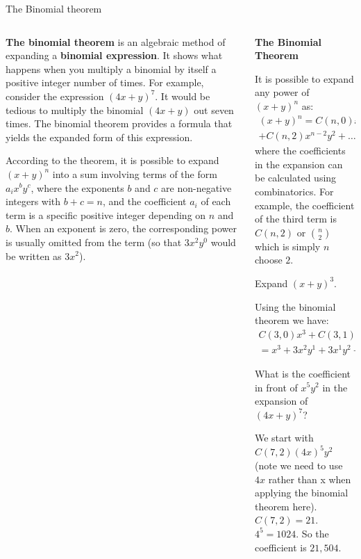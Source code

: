 \documentclass[9pt,aspectratio=169]{beamer}
\begin{document}
\begin{frame}{The Binomial theorem}
  \begin{columns}[T]
    \begin{column}{0.43\textwidth}
      \textbf{The binomial theorem} is an algebraic method of expanding a \textbf{binomial expression}.  It shows what happens when you multiply a binomial by itself a positive integer number of times.  For example, consider the expression $(4x+y)^7$. It would be tedious to multiply the binomial $(4x+y)$ out seven times. The binomial theorem provides a formula that yields the expanded form of this expression.
      
      \medskip
      According to the theorem, it is possible to expand $(x+y)^n$ into a sum involving terms of the form $a_i x^b y^c$, where the exponents $b$ and $c$ are non-negative integers with $b + c = n$, and the coefficient $a_i$ of each term is a specific positive integer depending on $n$ and $b$. When an exponent is zero, the corresponding power is usually omitted from the term (so that $3x^2 y^0$ would be written as $3x^2$).

    \end{column}
    \begin{column}{0.57\textwidth}
      \vspace*{-1em}
      \begin{definition}
        \textbf{The Binomial Theorem}

        It is possible to expand any power of $(x + y)^n$ as:
        \begin{multline*}
          (x + y)^n = C(n,0)x^n + C(n,1)x^{n-1}y^1 + \\
          +C(n,2)x^{n-2}y^2 + \ldots + C(n,n-1)x^1y^{n-1} + C(n,n)y^n      
        \end{multline*}
        where the coefficients in the expansion can be calculated using combinatorics.  For example, the coefficient of the third term is $C(n, 2)$ or $\binom{n}{2}$ which is simply $n$ choose $2$.
      \end{definition}
      
      \begin{problem}
        Expand $(x + y)^3$.        
      \end{problem}

      Using the binomial theorem we have:
      \begin{multline*}
        C(3,0)x^3 + C(3,1)x^2y^1 + C(3,2)x^1y^2 + C(3,3)y^3 =\\
          =x^3 + 3x^2y^1 + 3x^1y^2 + y^3.
      \end{multline*}
      \vspace*{-\intextsep}
      \begin{problem}
        What is the coefficient in front of $x^5y^2$ in the expansion of $(4x+y)^7$?
      \end{problem}

      We start with $C(7,2)(4x)^5y^2$ (note we need to use $4x$ rather than x when applying the binomial theorem here).  $C(7,2) = 21.$  $4^5 = 1024$.  So the coefficient is $21{,}504$.
    \end{column}
  \end{columns}
\end{frame}
\end{document}
